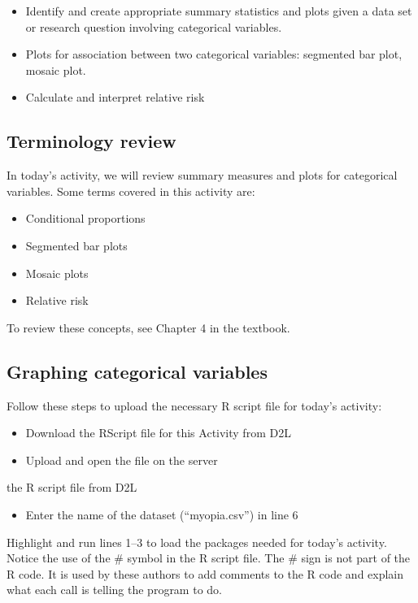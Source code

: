 \documentclass[
]{report}
\providecommand{\tightlist}{%
  \setlength{\itemsep}{0pt}\setlength{\parskip}{0pt}}
\begin{document}
\begin{itemize}
\item
  Identify and create appropriate summary statistics and plots given a data set or research question involving categorical variables.
\item
  Plots for association between two categorical variables:
  segmented bar plot, mosaic plot.
\item
  Calculate and interpret relative risk
\end{itemize}

\subsection{Terminology review}\label{terminology-review-6}

In today's activity, we will review summary measures and plots for categorical variables. Some terms covered in this activity are:

\begin{itemize}
\item
  Conditional proportions
\item
  Segmented bar plots
\item
  Mosaic plots
\item
  Relative risk
\end{itemize}

To review these concepts, see Chapter 4 in the textbook.

\subsection{Graphing categorical variables}\label{graphing-categorical-variables}

Follow these steps to upload the necessary R script file for today's activity:

\begin{itemize}
\item
  Download the RScript file for this Activity from D2L
\item
  Upload and open the file on the server
\end{itemize}

the R script file from D2L

\begin{itemize}
\tightlist
\item
  Enter the name of the dataset (``myopia.csv'') in line 6
\end{itemize}

Highlight and run lines 1--3 to load the packages needed for today's activity. Notice the use of the \# symbol in the R script file. The \# sign is not part of the R code. It is used by these authors to add comments to the R code and explain what each call is telling the program to do.
\end{document}
